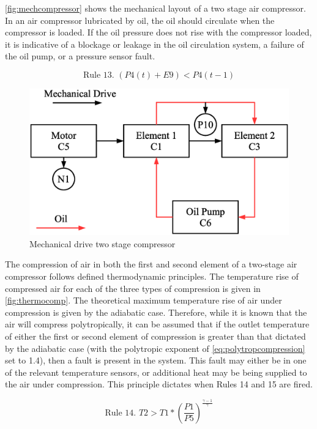 \autoref{fig:mechcompressor} shows the mechanical layout of a two stage air compressor. In an air compressor lubricated by oil, the oil should circulate when the compressor is loaded. If the oil pressure does not rise with the compressor loaded, it is indicative of a blockage or leakage in the oil circulation system, a failure of the oil pump, or a pressure sensor fault.

\begin{equation}
\text{Rule 13. }(P4(t) + E9) < P4(t-1)
\label{eq:rule13}
\end{equation}

\begin{figure}
\includegraphics[width = .9\columnwidth]{./Images/MechanicalCompressor.eps}
\caption{Mechanical drive two stage compressor}
\label{fig:mechcompressor}
\end{figure}

The compression of air in both the first and second element of a two-stage air compressor follows defined thermodynamic principles. The temperature rise of compressed air for each of the three types of compression is given in \autoref{fig:thermocomp}. The theoretical maximum temperature rise of air under compression is given by the adiabatic case. Therefore, while it is known that the air will compress polytropically, it can be assumed that if the outlet temperature of either the first or second element of compression is greater than that dictated by the adiabatic case (with the polytropic exponent of \autoref{eq:polytropcompression} set to 1.4), then a fault is present in the system. This fault may either be in one of the relevant temperature sensors, or additional heat may be being supplied to the air under compression. This principle dictates when Rules 14 and 15 are fired.

\begin{equation}
\text{Rule 14. } T2 > T1 * \left(\frac{P1}{P5}\right)^\frac{\gamma-1}{\gamma}
\label{eq:rule14}
\end{equation}

